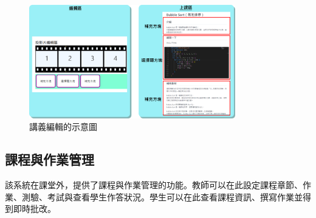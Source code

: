 \begin{enumerate}

  \begin{figure}[H]
    \centering
    \includegraphics[width=0.8\textwidth]{images/timezone.png}
    \caption{講義編輯的示意圖}
    \label{fig:edit}
  \end{figure}

\end{enumerate}

\subsection{課程與作業管理}
\label{sec:course-assignment}

該系統在課堂外，提供了課程與作業管理的功能。教師可以在此設定課程章節、作業、測驗、考試與查看學生作答狀況。學生可以在此查看課程資訊、撰寫作業並得到即時批改。

